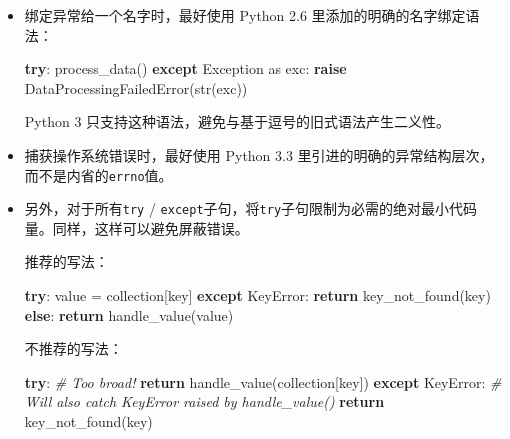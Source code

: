 \documentclass[ignorenonframetext,9pt]{beamer}
\newenvironment{Shaded}{}{}
\newcommand{\BuiltInTok}[1]{#1}
\newcommand{\CommentTok}[1]{\textcolor[rgb]{0.38,0.63,0.69}{\textit{#1}}}
\newcommand{\ControlFlowTok}[1]{\textcolor[rgb]{0.00,0.44,0.13}{\textbf{#1}}}
\newcommand{\ImportTok}[1]{#1}
\newcommand{\NormalTok}[1]{#1}
\newcommand{\OperatorTok}[1]{\textcolor[rgb]{0.40,0.40,0.40}{#1}}
\newcommand{\PreprocessorTok}[1]{\textcolor[rgb]{0.74,0.48,0.00}{#1}}
\begin{document}
\begin{frame}[fragile]

\begin{itemize}
\item
  绑定异常给一个名字时，最好使用 Python 2.6 里添加的明确的名字绑定语法：

\begin{Shaded}
\begin{Highlighting}[]
\ControlFlowTok{try}\NormalTok{:}
\NormalTok{    process_data()}
\ControlFlowTok{except} \PreprocessorTok{Exception} \ImportTok{as}\NormalTok{ exc:}
    \ControlFlowTok{raise}\NormalTok{ DataProcessingFailedError(}\BuiltInTok{str}\NormalTok{(exc))}
\end{Highlighting}
\end{Shaded}

  Python 3 只支持这种语法，避免与基于逗号的旧式语法产生二义性。
\item
  捕获操作系统错误时，最好使用 Python 3.3
  里引进的明确的异常结构层次，而不是内省的\texttt{errno}值。
\end{itemize}

\end{frame}

\begin{frame}[fragile]

\begin{itemize}
\item
  另外，对于所有\texttt{try} /
  \texttt{except}子句，将\texttt{try}子句限制为必需的绝对最小代码量。同样，这样可以避免屏蔽错误。

  推荐的写法：

\begin{Shaded}
\begin{Highlighting}[]
\ControlFlowTok{try}\NormalTok{:}
\NormalTok{    value }\OperatorTok{=}\NormalTok{ collection[key]}
\ControlFlowTok{except} \PreprocessorTok{KeyError}\NormalTok{:}
    \ControlFlowTok{return}\NormalTok{ key_not_found(key)}
\ControlFlowTok{else}\NormalTok{:}
    \ControlFlowTok{return}\NormalTok{ handle_value(value)}
\end{Highlighting}
\end{Shaded}

  不推荐的写法：

\begin{Shaded}
\begin{Highlighting}[]
\ControlFlowTok{try}\NormalTok{:}
    \CommentTok{# Too broad!}
    \ControlFlowTok{return}\NormalTok{ handle_value(collection[key])}
\ControlFlowTok{except} \PreprocessorTok{KeyError}\NormalTok{:}
    \CommentTok{# Will also catch KeyError raised by handle_value()}
    \ControlFlowTok{return}\NormalTok{ key_not_found(key)}
\end{Highlighting}
\end{Shaded}
\end{itemize}

\end{frame}
\end{document}
